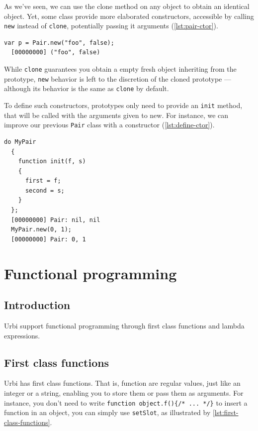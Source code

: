 \documentclass[openright,twoside,12pt]{report}
\newcommand{\urbi}{Urbi\xspace}
\newcommand{\lst}[1]{\autoref{lst:#1}}
\begin{document}
As we've seen, we can use the clone method on any object to obtain an
identical object. Yet, some class provide more elaborated
constructors, accessible by calling \texttt{new} instead of
\texttt{clone}, potentially passing it arguments (\lst{pair-ctor}).

\begin{lstlisting}[caption=Calling constructors with \texttt{new},
  label=lst:pair-ctor]
  var p = Pair.new("foo", false);
  [00000000] ("foo", false)
\end{lstlisting}

While \texttt{clone} guarantees you obtain a empty fresh object
inheriting from the prototype, \texttt{new} behavior is left to the
discretion of the cloned prototype --- although its behavior is the
same as \texttt{clone} by default.

To define such constructors, prototypes only need to provide an
\texttt{init} method, that will be called with the arguments given to
new. For instance, we can improve our previous \texttt{Pair} class
with a constructor (\lst{define-ctor}).

\begin{lstlisting}[caption=Defining constructors, label=lst:define-ctor]
  do MyPair
  {
    function init(f, s)
    {
      first = f;
      second = s;
    }
  };
  [00000000] Pair: nil, nil
  MyPair.new(0, 1);
  [00000000] Pair: 0, 1
\end{lstlisting}


\chapter{Functional programming}
\label{section:functional}

\section{Introduction}

\urbi support functional programming through first class functions and
lambda expressions.

\section{First class functions}

\urbi has first class functions. That is, function are regular values,
just like an integer or a string, enabling you to store them or pass
them as arguments. For instance, you don't need to write
\lstinline|function object.f(){/* ... */}| to insert a function in an
object, you can simply use \texttt{setSlot}, as illustrated by
\lst{first-class-functions}.
\end{document}
